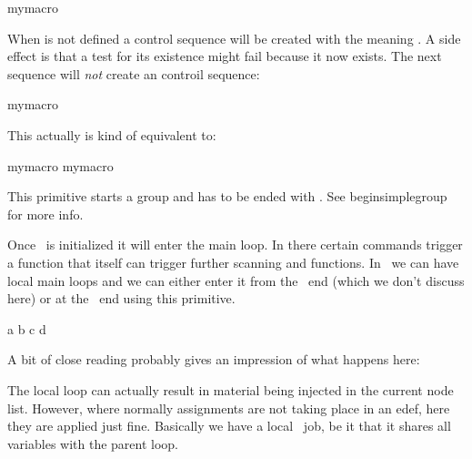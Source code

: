 \starttyping
\csname mymacro\endcsname
\stoptyping

When \type {\mymacro} is not defined a control sequence will be created with the
meaning . A side effect is that a test for its existence might fail
because it now exists. The next sequence will {\em not} create an controil
sequence:

\starttyping
\begincsname mymacro\endcsname
\stoptyping

This actually is kind of equivalent to:

\starttyping
\ifcsname mymacro\endcsname
    \csname mymacro\endcsname
\fi
\stoptyping

\stopnewprimitive

\startoldprimitive[title={\prm {begingroup}}]

This primitive starts a group and has to be ended with . See \prm
{beginsimplegroup} for more info.

\stopoldprimitive

\startnewprimitive[title={\prm {beginlocalcontrol}}]

Once \TEX\ is initialized it will enter the main loop. In there certain commands
trigger a function that itself can trigger further scanning and functions. In
\LUAMETATEX\ we can have local main loops and we can either enter it from the
\LUA\ end (which we don't discuss here) or at the \TEX\ end using this primitive.

\startbuffer
{}

\edef\whatever{
    a
    \beginlocalcontrol
        \advance\scratchcounter 10
        b
    \endlocalcontrol
    \beginlocalcontrol
        c
    \endlocalcontrol
    d
    \advance{}
}

\the\scratchcounter
\whatever
\the\scratchcounter
\stopbuffer

\typebuffer

A bit of close reading probably gives an impression of what happens here:

{\getbuffer}

The local loop can actually result in material being injected in the current node
list. However, where normally assignments are not taking place in an \prm
{edef}, here they are applied just fine. Basically we have a local \TEX\ job, be
it that it shares all variables with the parent loop.

\stopnewprimitive

\startnewprimitive[title={\prm {beginmathgroup}}]

